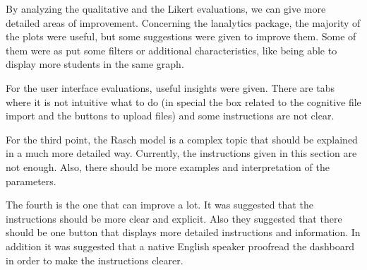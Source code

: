By analyzing the qualitative and the Likert evaluations, we can give more detailed areas of improvement. Concerning the lanalytics package, the majority of the plots were useful, but some suggestions were given to improve them. Some of them were as put some filters or additional characteristics, like being able to display more students in the same graph. 

For the user interface evaluations, useful insights were given. There are tabs where it is not intuitive what to do (in special the box related to the cognitive file import and the buttons to upload files) and some instructions are not clear.

For the third point, the Rasch model is a complex topic that should be explained in a much more detailed way. Currently, the instructions given in this section are not enough. Also, there should be more examples and interpretation of the parameters.

The fourth is the one that can improve a lot. It was suggested that the instructions should be more clear and explicit. Also they suggested that there should be one button that displays more detailed instructions and information. In addition it was suggested that a native English speaker proofread the dashboard in order to make the instructions clearer.






